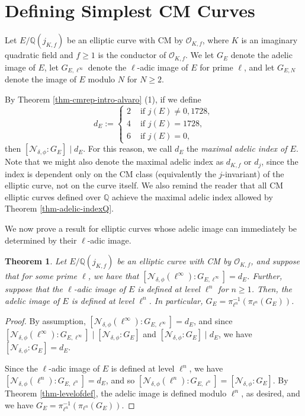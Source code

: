 \documentclass[11pt]{amsart}
\newtheorem{theorem}[defn]{Theorem}
\theoremstyle{definition}
\newcommand{\Q}{\mathbb{Q}}
\newcommand{\Of}{\mathcal{O}_{K,f}}
\begin{document}
\section{Defining Simplest CM Curves}\label{sec-simplestCMcurves}

Let $E/\Q(j_{K,f})$ be an elliptic curve with CM by $\Of$, where $K$ is an imaginary quadratic field and $f \geq 1$ is the conductor of $\Of$. We let $G_{E}$ denote the adelic image of $E$, let $G_{E, \ell^{\infty}}$ denote the $\ell$-adic image of $E$ for prime $\ell$, and let $G_{E, N}$ denote the image of $E$ modulo $N$ for $N \geq 2$.

By Theorem \ref{thm-cmrep-intro-alvaro} (1), if we define
\[ d_E
:=
\begin{cases}
2 & \text{ if } j(E) \neq 0, 1728, \\
4 & \text{ if } j(E) = 1728, \\
6 & \text{ if } j(E) = 0,
\end{cases} \]
then $[\mathcal{N}_{\delta, \phi} : G_{E}] \mid d_{E}$. For this reason, we call $d_E$ the \emph{maximal adelic index of $E$}. Note that we might also denote the maximal adelic index as $d_{K,f}$ or $d_{j}$, since the index is dependent only on the CM class (equivalently the $j$-invariant) of the elliptic curve, not on the curve itself. We also remind the reader that all CM elliptic curves defined over $\Q$ achieve the maximal adelic index allowed by Theorem \ref{thm-adelic-indexQ}. 

We now prove a result for elliptic curves whose adelic image can immediately be determined by their $\ell$-adic image.

\begin{theorem}\label{thm-ell-simplest}
    Let $E/\Q(j_{K, f})$ be an elliptic curve with CM by $\Of$, and suppose that for some prime $\ell$, we have that $[\mathcal{N}_{\delta, \phi}(\ell^{\infty}) : G_{E, \ell^{\infty}}] = d_E$. Further, suppose that the $\ell$-adic image of $E$ is defined at level $\ell^n$ for $n \geq 1$. Then, the adelic image of $E$ is defined at level $\ell^n$. In particular, $G_{E} = \pi_{\ell^n}^{-1}(\pi_{\ell^n}(G_{E}))$.
\end{theorem}

\begin{proof}
    By assumption, $[\mathcal{N}_{\delta, \phi}(\ell^{\infty}) : G_{E, \ell^{\infty}}] = d_E$, and since $[\mathcal{N}_{\delta, \phi}(\ell^{\infty}) : G_{E, \ell^{\infty}}] \mid [\mathcal{N}_{\delta, \phi} : G_{E}]$ and $[\mathcal{N}_{\delta, \phi} : G_{E}] \mid  d_E$, we have $[\mathcal{N}_{\delta, \phi} : G_{E}] = d_E$.

    Since the $\ell$-adic image of $E$ is defined at level $\ell^n$, we have $[\mathcal{N}_{\delta, \phi}(\ell^n) : G_{E, \ell^n}] = d_E$, and so $[\mathcal{N}_{\delta, \phi}(\ell^n) : G_{E, \ell^n}] = [\mathcal{N}_{\delta, \phi} : G_{E}]$. By Theorem \ref{thm-levelofdef}, the adelic image is defined modulo $\ell^n$, as desired, and we have $G_{E} = \pi_{\ell^n}^{-1}(\pi_{\ell^n}(G_{E}))$.
\end{proof}
\end{document}
